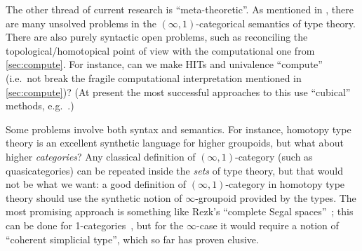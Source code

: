 \documentclass[12pt]{article}
\def\oo{\ensuremath{\infty}}
\def\io{\ensuremath{(\oo,1)}}
\numberwithin{equation}{section}
\begin{document}

The other thread of current research is ``meta-theoretic''.
As mentioned in , there are many unsolved problems in the $\io$-categorical semantics of type theory.
There are also purely syntactic open problems, such as reconciling the topological/homotopical point of view with the computational one from \cref{sec:compute}.
For instance, can we make HITs and univalence ``compute'' (i.e.\ not break the fragile computational interpretation mentioned in \cref{sec:compute})?
(At present the most successful approaches to this use ``cubical'' methods, e.g.~\cite{coquand:ctt0915,cohen:cubicaltt,ahw:chtt-i,ah:chtt-ii}.)

Some problems involve both syntax and semantics.
For instance, homotopy type theory is an excellent synthetic language for higher groupoids, but what about higher \emph{categories}?
Any classical definition of \io-category (such as quasicategories) can be repeated inside the \emph{sets} of type theory, but that would not be what we want: a good definition of \io-category in homotopy type theory should use the synthetic notion of \oo-groupoid provided by the types.
The most promising approach is something like Rezk's ``complete Segal spaces''~\cite{rezk:css}; this can be done for 1-categories~\cite{aks:rezk}, but for the \oo-case it would require a notion of ``coherent simplicial type'', which so far has proven elusive.

\end{document}
